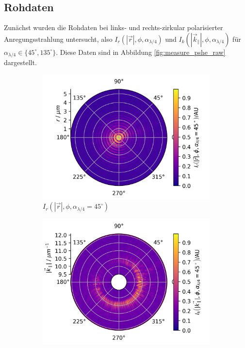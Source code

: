 \documentclass[a4paper, titlepage,  ngerman, fullpage]{book}
\begin{document}
	\subsection{Rohdaten}
	Zunächst wurden die Rohdaten bei links- und rechts-zirkular polarisierter Anregungsstrahlung untersucht, also $I_r(|\vec{r}|, \phi, \alpha_{\lambda /4})$ und $I_k(|\vec{k}_\parallel|, \phi, \alpha_{\lambda /4})$ für $\alpha_{\lambda /4} \in \{45^\circ, 135^\circ\}$. Diese Daten sind in Abbildung \ref{fig:measure_pshe_raw} dargestellt. 
	\begin{figure}
		\begin{subfigure}{0.49\textwidth}
			\centering
			\includegraphics[width=\textwidth]{figures/new/4_3_fp_45.png}
			\caption{$I_r(|\vec{r}|, \phi, \alpha_{\lambda /4} = 45^\circ)$}
			\label{fig:raw_fp_45}
		\end{subfigure}
		\begin{subfigure}{0.5\textwidth}
			\centering
			\includegraphics[width=\textwidth]{figures/new/4_3_bfp_45.png}

\end{subfigure}
\end{figure}
\end{document}
